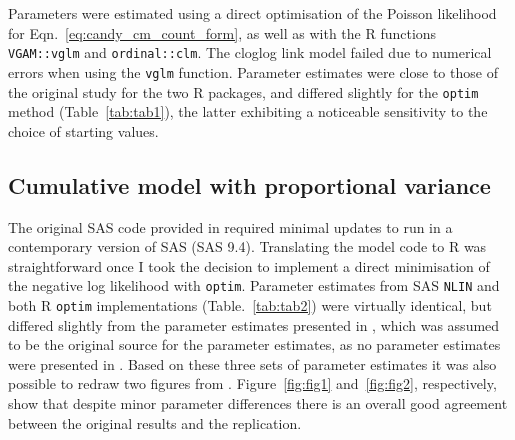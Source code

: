 Parameters were estimated using a direct optimisation of the Poisson likelihood for Eqn.~\ref{eq:candy_cm_count_form}, as well as with the R functions \verb+VGAM::vglm+ and \verb+ordinal::clm+. 
The cloglog link model failed due to numerical errors when using the \verb+vglm+ function. 
Parameter estimates were close to those of the original study for the two R packages, and differed slightly for the \verb+optim+ method (Table~\ref{tab:tab1}), the latter exhibiting a noticeable sensitivity to the choice of starting values.

\subsection{Cumulative model with proportional variance}



The original SAS code provided in \citep{dennis1986stochastic} required minimal updates to run in a contemporary version of SAS (SAS 9.4). 
Translating the model code to R was straightforward once I took the decision to implement a direct minimisation of the negative log likelihood with \verb+optim+.  
Parameter estimates from SAS \verb+NLIN+ and both R \verb+optim+ implementations (Table.~\ref{tab:tab2}) were virtually identical, but differed slightly from the parameter estimates presented in \citep{kemp1986stochastic}, which was assumed to be the original source for the parameter estimates, as no parameter estimates were presented in \citep{dennis1986stochastic}. 
Based on these three sets of parameter estimates it was also possible to redraw two figures from \citep{dennis1986stochastic}. 
Figure~\ref{fig:fig1} and~\ref{fig:fig2}, respectively,  show that despite minor parameter differences there is an overall good agreement between the original results and the replication.



